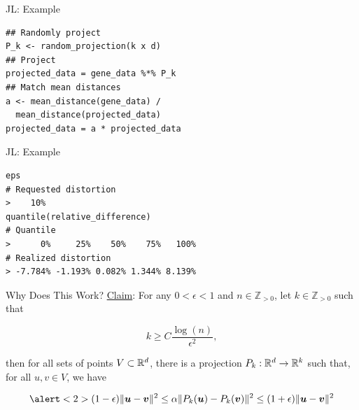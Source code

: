 \documentclass[14pt]{beamer}
\begin{document}
\begin{frame}[fragile]{JL: Example}
  \begin{lstlisting}
## Randomly project
P_k <- random_projection(k x d)
## Project
projected_data = gene_data %*% P_k
## Match mean distances
a <- mean_distance(gene_data) /
  mean_distance(projected_data)
projected_data = a * projected_data
  \end{lstlisting}
\end{frame}

\begin{frame}[fragile]{JL: Example}
  \begin{lstlisting}
eps
# Requested distortion
>    10%
quantile(relative_difference)
# Quantile
>      0%     25%    50%    75%   100%
# Realized distortion
> -7.784% -1.193% 0.082% 1.344% 8.139%
  \end{lstlisting}
\end{frame}

\begin{frame}{Why Does This Work?}
  \underline{Claim}: For any $0<\epsilon<1$ and $n\in\mathbb{Z}_{>0}$, let
  $k\in\mathbb{Z}_{>0}$ such that

  \begin{equation*}
    k \geq C \frac{\log(n)}{\epsilon^2},
  \end{equation*}

  \noindent then for all sets of points $V\subset\mathbb{R}^{d}$, there is a projection
  $P_k:\mathbb{R}^{d}\to\mathbb{R}^{k}$ such that, for all $u,v\in V$, we have

    \begin{equation*}
      \alert<2>{(1 - \epsilon)\|\vu - \vv\|^2 \leq \alpha\|P_k(\vu) - P_k(\vv)\|^2 \leq %
      (1 + \epsilon)\|\vu - \vv\|^2
}    \end{equation*}
\end{frame}
\end{document}
